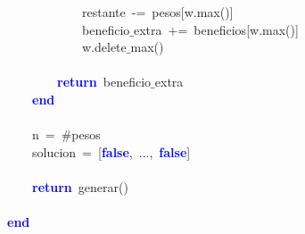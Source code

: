 \mbox{}\ \ \ \ \ \ \ \ \ \ \ \ restante\ \textcolor{BrickRed}{-=}\ pesos\textcolor{BrickRed}{[}w\textcolor{BrickRed}{.}max\textcolor{BrickRed}{()]} \\
\mbox{}\ \ \ \ \ \ \ \ \ \ \ \ beneficio$\_$extra\ \textcolor{BrickRed}{+=}\ beneficios\textcolor{BrickRed}{[}w\textcolor{BrickRed}{.}max\textcolor{BrickRed}{()]} \\
\mbox{}\ \ \ \ \ \ \ \ \ \ \ \ w\textcolor{BrickRed}{.}delete$\_$max\textcolor{BrickRed}{()} \\
\mbox{} \\
\mbox{}\ \ \ \ \ \ \ \ \textbf{\textcolor{Blue}{return}}\ beneficio$\_$extra \\
\mbox{}\ \ \ \ \textbf{\textcolor{Blue}{end}} \\
\mbox{} \\
\mbox{}\ \ \ \ n\ \textcolor{BrickRed}{=}\ #pesos \\
\mbox{}\ \ \ \ solucion\ \textcolor{BrickRed}{=}\ \textcolor{BrickRed}{[}\textbf{\textcolor{Blue}{false}}\textcolor{BrickRed}{,}\ \textcolor{BrickRed}{...,}\ \textbf{\textcolor{Blue}{false}}\textcolor{BrickRed}{]} \\
\mbox{} \\
\mbox{}\ \ \ \ \textbf{\textcolor{Blue}{return}}\ generar\textcolor{BrickRed}{()} \\
\mbox{} \\
\mbox{}\textbf{\textcolor{Blue}{end}} \\
\mbox{}
